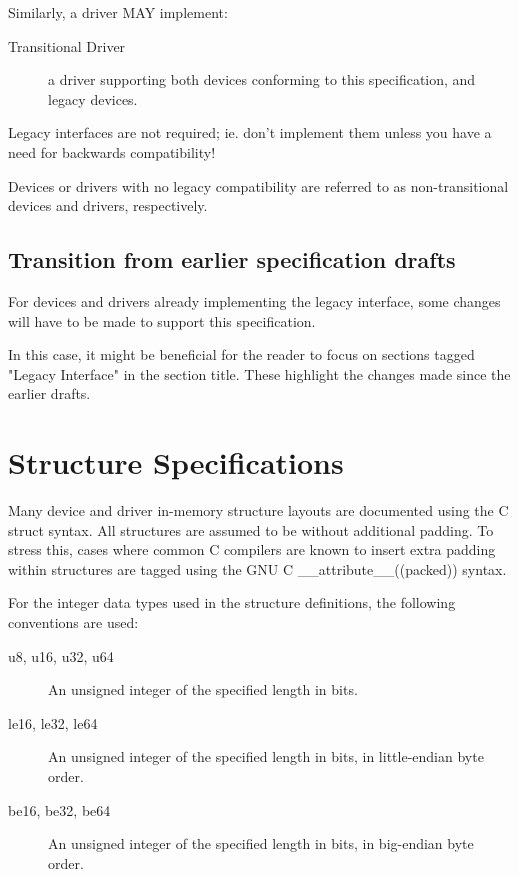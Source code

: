 Similarly, a driver MAY implement:
\begin{description}
\item[Transitional Driver]
        a driver supporting both devices conforming to this
        specification, and legacy devices.
\end{description}

\begin{note}
  Legacy interfaces are not required; ie. don't implement them unless you
  have a need for backwards compatibility!
\end{note}

Devices or drivers with no legacy compatibility are referred to as
non-transitional devices and drivers, respectively.

\subsection{Transition from earlier specification drafts}\label{sec:Transition from earlier specification drafts}

For devices and drivers already implementing the legacy
interface, some changes will have to be made to support this
specification.

In this case, it might be beneficial for the reader to focus on
sections tagged "Legacy Interface" in the section title.
These highlight the changes made since the earlier drafts.

\section{Structure Specifications}\label{sec:Structure Specifications}

Many device and driver in-memory structure layouts are documented using
the C struct syntax. All structures are assumed to be without additional
padding. To stress this, cases where common C compilers are known to insert
extra padding within structures are tagged using the GNU C
__attribute__((packed))  syntax.

For the integer data types used in the structure definitions, the following
conventions are used:

\begin{description}
\item[u8, u16, u32, u64] An unsigned integer of the specified length in bits.

\item[le16, le32, le64] An unsigned integer of the specified length in bits,
in little-endian byte order.

\item[be16, be32, be64] An unsigned integer of the specified length in bits,
in big-endian byte order.
\end{description}

